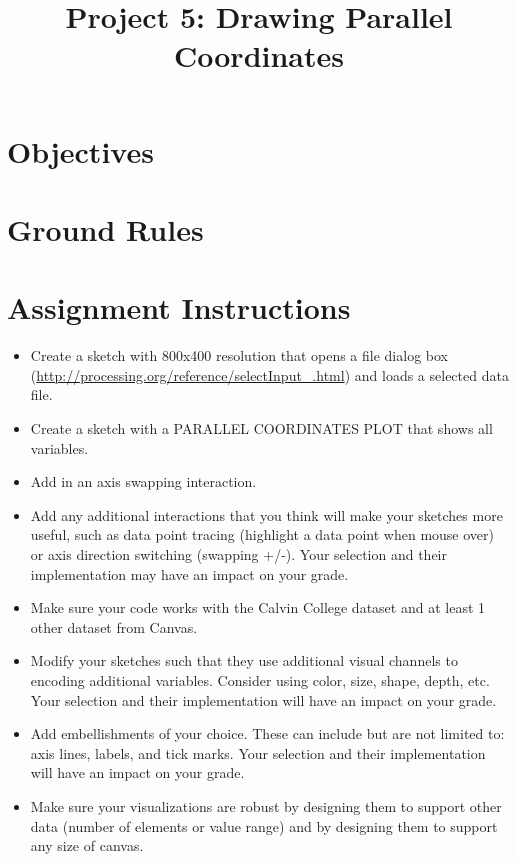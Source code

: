 \documentclass[a4paper,12pt]{article}
\title{Project 5: Drawing Parallel Coordinates}
\begin{document}
\maketitle

\section{Objectives}



\section{Ground Rules}

\groundrules



\section{Assignment Instructions}

\begin{itemize}


\item Create a sketch with 800x400 resolution that opens a file dialog box (\url{http://processing.org/reference/selectInput_.html}) and loads a selected data file. 

\item Create a sketch with a PARALLEL COORDINATES PLOT that shows all variables.

\item Add in an axis swapping interaction.

\item Add any additional interactions that you think will make your sketches more useful, such as data point tracing (highlight a data point when mouse over) or axis direction switching (swapping +/-). Your selection and their implementation may have an impact on your grade.

\item Make sure your code works with the Calvin College dataset and at least 1 other dataset from Canvas.


\item Modify your sketches such that they use additional visual channels to encoding additional variables. Consider using color, size, shape, depth, etc. Your selection and their implementation will have an impact on your grade.

\item Add embellishments of your choice. These can include but are not limited to: axis lines, labels, and tick marks. Your selection and their implementation will have an impact on your grade.

\item Make sure your visualizations are robust by designing them to support other data (number of elements or value range) and by designing them to support any size of canvas.

\end{itemize}
\end{document}
